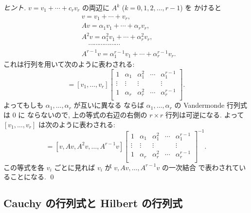 \documentclass[12pt,twoside]{jarticle}
\begin{document}
\begin{proof}[ヒント]
  $v = v_1 + \cdots + c_r v_r$ の両辺に $A^k$ ($k=0,1,2,\ldots,r-1$) を
  かけると
  \begin{align*}
    &
    v = v_1 + \cdots + v_r,
    \\ &
    Av = \alpha_1 v_1 + \cdots + \alpha_r v_r,
    \\ &
    A^2v = \alpha_1^2 v_1 + \cdots + \alpha_r^2 v_r,
    \\ &
    \quad\cdots\cdots\cdots\cdots\cdots\cdots
    \\ &
    A^{r-1}v = \alpha_1^{r-1}v_1 + \cdots + \alpha_r^{r-1}v_r.
  \end{align*}
  これは行列を用いて次のように表わされる:
  \begin{equation*}
    [v,Av,A^2v,\ldots,A^{r-1}v]
    = [v_1,\ldots,v_r]
    \begin{bmatrix}
      1      & \alpha_1 & \alpha_1^2 & \cdots & \alpha_1^{r-1} \\
      \vdots & \vdots   & \vdots     &        & \vdots \\
      1      & \alpha_r & \alpha_r^2 & \cdots & \alpha_r^{r-1} \\
    \end{bmatrix}.
  \end{equation*}
  よってもしも $\alpha_1,\ldots,\alpha_r$ が互いに異なる
  ならば $\alpha_1,\ldots,\alpha_r$ の Vandermonde 行列式は $0$ に
  ならないので, 上の等式の右辺の右側の $r\times r$ 行列は可逆になる.
  よって $[v_1,\ldots,v_r]$ は次のように表わされる:
  \begin{equation*}
    [v_1,\ldots,v_r]
    =
    [v,Av,A^2v,\ldots,A^{r-1}v]
    \begin{bmatrix}
      1      & \alpha_1 & \alpha_1^2 & \cdots & \alpha_1^{r-1} \\
      \vdots & \vdots   & \vdots     &        & \vdots \\
      1      & \alpha_r & \alpha_r^2 & \cdots & \alpha_r^{r-1} \\
    \end{bmatrix}^{-1}.
  \end{equation*}
  この等式を各 $v_i$ ごとに見れば $v_i$ が $v,Av,\ldots,A^{r-1}v$ の一次結合
  で表わされていることになる.
  \qed
\end{proof}


\subsection{Cauchy の行列式と Hilbert の行列式}
\end{document}
